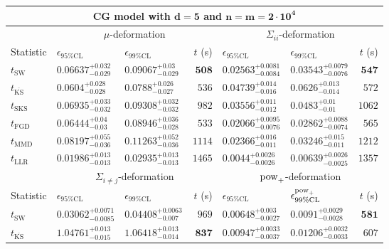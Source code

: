 \begin{tabular}{l|llr|llr}
	\toprule
	\multicolumn{7}{c}{{\bf CG model with $\mathbf{d=5}$ and $\mathbf{n=m=2\cdot 10^{4}}$}} \\
	\toprule
	\multicolumn{1}{c}{} & \multicolumn{3}{c}{$\mu$-deformation} & \multicolumn{3}{c}{$\Sigma_{ii}$-deformation} \\
	Statistic & $\epsilon_{95\%\mathrm{CL}}$ & $\epsilon_{99\%\mathrm    {CL}}$ & $t$ (s) & $\epsilon_{95\%\mathrm{CL}}$ & $\epsilon_{99\%\mathrm{CL}}$ & $t$ (s) \\
	\midrule
	$t_{\mathrm{SW}}$ & $0.06637_{-0.029}^{+0.032}$ & $0.09067_{-0.029}^{+0.03}$ & ${\mathbf{508}}$ & $0.02563_{-0.0084}^{+0.0081}$ & $0.03543_{-0.0076}^{+0.0079}$ & ${\mathbf{547}}$ \\
	$t_{\overline{\mathrm{KS}}}$ & ${\mathbf{0.0604_{-0.028}^{+0.028}}}$ & ${\mathbf{0.0788_{-0.027}^{+0.026}}}$ & $536$ & $0.04739_{-0.016}^{+0.014}$ & $0.0626_{-0.014}^{+0.013}$ & $572$ \\
	$t_{\mathrm{SKS}}$ & $0.06935_{-0.032}^{+0.033}$ & $0.09308_{-0.032}^{+0.032}$ & $982$ & $0.03556_{-0.012}^{+0.011}$ & $0.0483_{-0.01}^{+0.01}$ & $1062$ \\
	$t_{\mathrm{FGD}}$ & $0.06444_{-0.03}^{+0.04}$ & $0.08946_{-0.028}^{+0.036}$ & $533$ & ${\mathbf{0.02066_{-0.0076}^{+0.0095}}}$ & ${\mathbf{0.02862_{-0.0074}^{+0.0088}}}$ & $565$ \\
	$t_{\mathrm{MMD}}$ & $0.08197_{-0.036}^{+0.055}$ & $0.11263_{-0.036}^{+0.052}$ & $1114$ & $0.02366_{-0.011}^{+0.016}$ & $0.03246_{-0.011}^{+0.015}$ & $1212$ \\
	$t_{\mathrm{LLR}}$ & $0.01986_{-0.013}^{+0.013}$ & $0.02935_{-0.013}^{+0.013}$ & $1465$ & $0.0044_{-0.0026}^{+0.0026}$ & $0.00639_{-0.0025}^{+0.0026}$ & $1357$ \\
	\toprule
	\multicolumn{1}{c}{} & \multicolumn{3}{c}{$\Sigma_{i\neq j}$-deformation} & \multicolumn{3}{c}{$\rm{pow}_{+}$-deformation} \\
	Statistic & $\epsilon_{95\%\mathrm{CL}}$ & $\epsilon_{99\%\mathrm{CL}}$ & $t$ (s) & $\epsilon_{95\%\mathrm{CL}}$ & $\epsilon^{\rm   {pow}_{+}}_{99\%\mathrm{CL}}$ & $t$ (s) \\
	\midrule
	$t_{\mathrm{SW}}$ & $0.03062_{-0.0085}^{+0.0071}$ & $0.04408_{-0.007}^{+0.0063}$ & $969$ & $0.00648_{-0.0027}^{+0.003}$ & $0.0091_{-0.0028}^{+0.0029}$ & ${\mathbf{581}}$ \\
	$t_{\overline{\mathrm{KS}}}$ & $1.04761_{-0.015}^{+0.013}$ & $1.06418_{-0.014}^{+0.013}$ & ${\mathbf{837}}$ & $0.00947_{-0.0037}^{+0.0033}$ & $0.01206_{-0.0033}^{+0.0032}$ & $607$ \\

\end{tabular}
